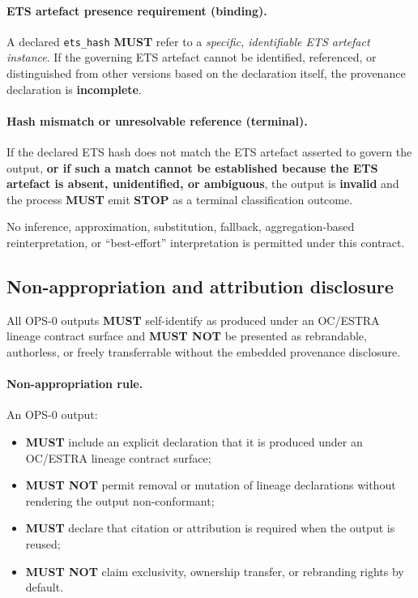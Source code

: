 \paragraph{ETS artefact presence requirement (binding).}
A declared \texttt{ets\_hash} \textbf{MUST} refer to a
\emph{specific, identifiable ETS artefact instance}.
If the governing ETS artefact cannot be identified,
referenced, or distinguished from other versions
based on the declaration itself,
the provenance declaration is \textbf{incomplete}.

\paragraph{Hash mismatch or unresolvable reference (terminal).}
If the declared ETS hash does not match
the ETS artefact asserted to govern the output,
\textbf{or if such a match cannot be established because
the ETS artefact is absent, unidentified, or ambiguous},
the output is \textbf{invalid} and the process
\textbf{MUST} emit \textbf{STOP}
as a terminal classification outcome.

No inference, approximation, substitution,
fallback, aggregation-based reinterpretation,
or ``best-effort'' interpretation
is permitted under this contract.

\subsection{Non-appropriation and attribution disclosure}
All OPS-0 outputs \textbf{MUST} self-identify
as produced under an OC/ESTRA lineage
contract surface and \textbf{MUST NOT}
be presented as rebrandable, authorless,
or freely transferrable without the embedded
provenance disclosure.

\paragraph{Non-appropriation rule.}
An OPS-0 output:

\begin{itemize}
  \item \textbf{MUST} include an explicit declaration
        that it is produced under an OC/ESTRA
        lineage contract surface;
  \item \textbf{MUST NOT} permit removal or mutation
        of lineage declarations without rendering
        the output non-conformant;
  \item \textbf{MUST} declare that citation or attribution
        is required when the output is reused;
  \item \textbf{MUST NOT} claim exclusivity,
        ownership transfer, or rebranding rights
        by default.
\end{itemize}

